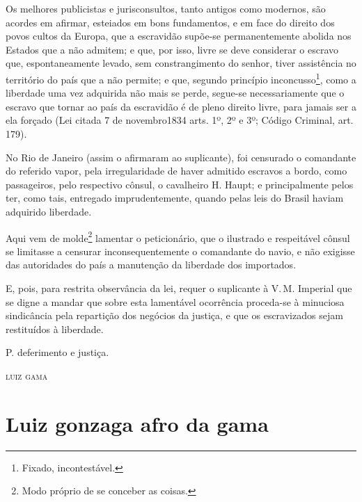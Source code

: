 Os melhores publicistas e jurisconsultos, tanto antigos como modernos,
são acordes em afirmar, esteiados em bons fundamentos, e em face do
direito dos povos cultos da Europa, que a escravidão supõe-se
permanentemente abolida nos Estados que a não admitem; e que, por isso,
livre se deve considerar o escravo que, espontaneamente levado, sem
constrangimento do senhor, tiver assistência no território do país que a
não permite; e que, segundo princípio inconcusso\footnote{ Fixado,
  incontestável.}, como a liberdade uma vez adquirida não mais se perde,
segue-se necessariamente que o escravo que tornar ao país da escravidão
é de pleno direito livre, para jamais ser a ela forçado (Lei citada 7 de
novembro1834 arts. 1º, 2º e 3º; Código Criminal, art. 179).

No Rio de Janeiro (assim o afirmaram ao suplicante), foi censurado o
comandante do referido vapor, pela irregularidade de haver admitido
escravos a bordo, como passageiros, pelo respectivo cônsul, o cavalheiro
H. Haupt; e principalmente pelos ter, como tais, entregado
imprudentemente, quando pelas leis do Brasil haviam adquirido liberdade.

Aqui vem de molde\footnote{ Modo próprio de se conceber as coisas.}
lamentar o peticionário, que o ilustrado e respeitável cônsul se
limitasse a censurar inconsequentemente o comandante do navio, e não
exigisse das autoridades do país a manutenção da liberdade dos
importados.

E, pois, para restrita observância da lei, requer o suplicante à V.\,M.
Imperial que se digne a mandar que sobre esta lamentável ocorrência
proceda-se à minuciosa sindicância pela repartição dos negócios da
justiça, e que os escravizados sejam restituídos à liberdade.

P. deferimento e justiça.

\begin{flushright}
\textsc{luiz gama}
\end{flushright}

\part{Luiz gonzaga afro da gama}

